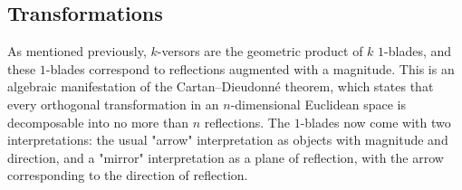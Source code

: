 \documentclass{juliacon}
\begin{document}
\subsection{Transformations}

As mentioned previously, $k$-versors are the geometric product of $k$ $1$-blades, and these $1$-blades correspond to reflections augmented with a magnitude. This is an algebraic manifestation of the Cartan–Dieudonné theorem, which states that every orthogonal transformation in an $n$-dimensional Euclidean space is decomposable into no more than $n$ reflections. The $1$-blades now come with two interpretations: the usual "arrow" interpretation as objects with magnitude and direction, and a "mirror" interpretation as a plane of reflection, with the arrow corresponding to the direction of reflection.
\end{document}

